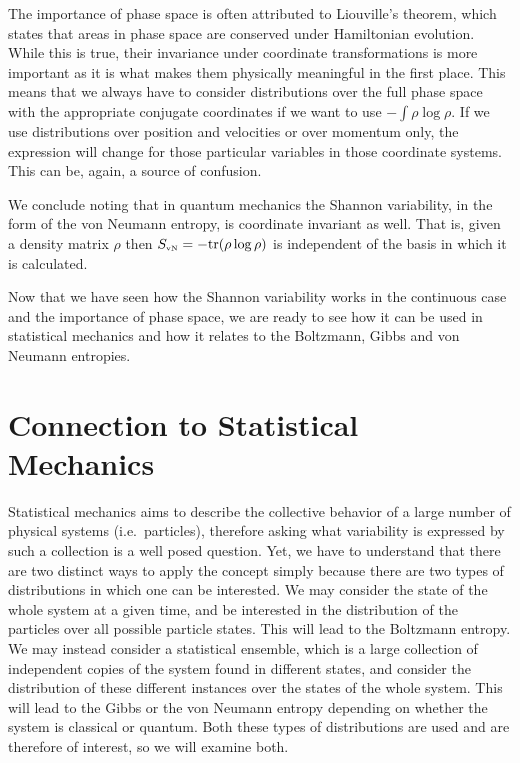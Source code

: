 \documentclass[iopart]{revtex4-1}
\begin{document}
The importance of phase space is often attributed to Liouville's theorem, which states that areas in phase space are conserved under Hamiltonian evolution. While this is true, their invariance under coordinate transformations is more important as it is what makes them physically meaningful in the first place. This means that we always have to consider distributions over the full phase space with the appropriate conjugate coordinates if we want to use $-\int \rho \log \rho$. If we use distributions over position and velocities or over momentum only, the expression will change for those particular variables in those coordinate systems. This can be, again, a source of confusion.\cite{Dunkel}


We conclude noting that in quantum mechanics the Shannon variability, in the form of the von Neumann entropy, is coordinate invariant as well. That is, given a density matrix $\rho$ then $S_\textrm{\tiny{vN}} = - \textrm{tr}(\rho \log \rho)$ is independent of the basis in which it is calculated.

Now that we have seen how the Shannon variability works in the continuous case and the importance of phase space, we are ready to see how it can be used in statistical mechanics and how it relates to the Boltzmann, Gibbs and von Neumann entropies.

\section{Connection to Statistical Mechanics\label{csm}}

Statistical mechanics aims to describe the collective behavior of a large number of physical systems (i.e.~particles), therefore asking what variability is expressed by such a collection is a well posed question. Yet, we have to understand that there are two distinct ways to apply the concept simply because there are two types of distributions in which one can be interested. We may consider the state of the whole system at a given time, and be interested in the distribution of the particles over all possible particle states. This will lead to the Boltzmann entropy. We may instead consider a statistical ensemble, which is a large collection of independent copies of the system found in different states, and consider the distribution of these different instances over the states of the whole system. This will lead to the Gibbs or the von Neumann entropy depending on whether the system is classical or quantum. Both these types of distributions are used and are therefore of interest, so we will examine both.
\end{document}
